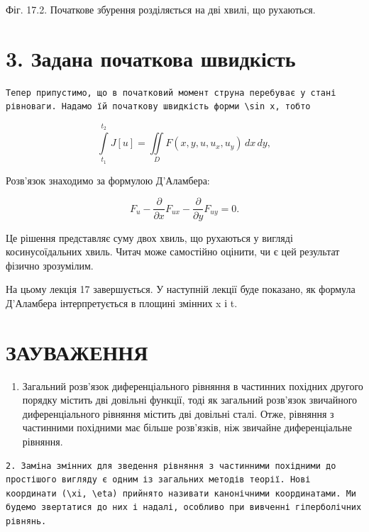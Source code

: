 \documentclass[
  ukrainian,
]{article}
\providecommand{\tightlist}{%
  \setlength{\itemsep}{0pt}\setlength{\parskip}{0pt}}
\begin{document}
Фіг. 17.2. Початкове збурення розділяється на дві хвилі, що рухаються.

\section{3. Задана початкова
швидкість}\label{ux437ux430ux434ux430ux43dux430-ux43fux43eux447ux430ux442ux43aux43eux432ux430-ux448ux432ux438ux434ux43aux456ux441ux442ux44c}

\begin{verbatim}
Тепер припустимо, що в початковий момент струна перебуває у стані рівноваги. Надамо їй початкову швидкість форми \sin x, тобто
\end{verbatim}

\[
\int\limits_{t_1}^{t_2} J[u] = \iint\limits_D F(x, y, u, u_x, u_y)\,dx\,dy,
\]

Розв'язок знаходимо за формулою Д'Аламбера:

\[
F_u - \frac{\partial}{\partial x}F_{ux} - \frac{\partial}{\partial y}F_{uy} = 0.
\]

Це рішення представляє суму двох хвиль, що рухаються у вигляді
косинусоїдальних хвиль. Читач може самостійно оцінити, чи є цей
результат фізично зрозумілим.

На цьому лекція 17 завершується. У наступній лекції буде показано, як
формула Д'Аламбера інтерпретується в площині змінних x і t.

\section{ЗАУВАЖЕННЯ}\label{ux437ux430ux443ux432ux430ux436ux435ux43dux43dux44f-8}

\begin{enumerate}
\def\labelenumi{\arabic{enumi}.}
\tightlist
\item
  Загальний розв'язок диференціального рівняння в частинних похідних
  другого порядку містить дві довільні функції, тоді як загальний
  розв'язок звичайного диференціального рівняння містить дві довільні
  сталі. Отже, рівняння з частинними похідними має більше розв'язків,
  ніж звичайне диференціальне рівняння.
\end{enumerate}

\begin{verbatim}
2. Заміна змінних для зведення рівняння з частинними похідними до простішого вигляду є одним із загальних методів теорії. Нові координати (\xi, \eta) прийнято називати канонічними координатами. Ми будемо звертатися до них і надалі, особливо при вивченні гіперболічних рівнянь.
\end{verbatim}
\end{document}
